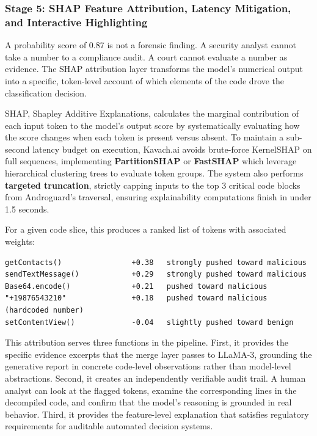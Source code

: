 \documentclass[10pt,a4paper]{article}
\begin{document}
\subsubsection*{Stage 5: SHAP Feature Attribution, Latency Mitigation, and Interactive Highlighting}

A probability score of 0.87 is not a forensic finding. A security analyst cannot take a number to a compliance audit. A court cannot evaluate a number as evidence. The SHAP attribution layer transforms the model's numerical output into a specific, token-level account of which elements of the code drove the classification decision.

SHAP, Shapley Additive Explanations, calculates the marginal contribution of each input token to the model's output score by systematically evaluating how the score changes when each token is present versus absent. To maintain a sub-second latency budget on execution, Kavach.ai avoids brute-force KernelSHAP on full sequences, implementing \textbf{PartitionSHAP} or \textbf{FastSHAP} which leverage hierarchical clustering trees to evaluate token groups. The system also performs \textbf{targeted truncation}, strictly capping inputs to the top 3 critical code blocks from Androguard's traversal, ensuring explainability computations finish in under 1.5 seconds.

For a given code slice, this produces a ranked list of tokens with associated weights:
\begin{rulebox}
\begin{verbatim}
getContacts()                +0.38   strongly pushed toward malicious
sendTextMessage()            +0.29   strongly pushed toward malicious
Base64.encode()              +0.21   pushed toward malicious
"+19876543210"               +0.18   pushed toward malicious (hardcoded number)
setContentView()             -0.04   slightly pushed toward benign
\end{verbatim}
\end{rulebox}

This attribution serves three functions in the pipeline. First, it provides the specific evidence excerpts that the merge layer passes to LLaMA-3, grounding the generative report in concrete code-level observations rather than model-level abstractions. Second, it creates an independently verifiable audit trail. A human analyst can look at the flagged tokens, examine the corresponding lines in the decompiled code, and confirm that the model's reasoning is grounded in real behavior. Third, it provides the feature-level explanation that satisfies regulatory requirements for auditable automated decision systems.
\end{document}
